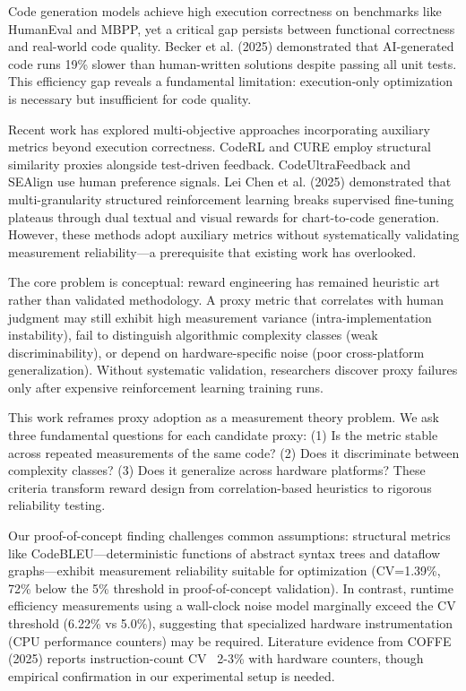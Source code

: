 
Code generation models achieve high execution correctness on benchmarks like HumanEval and MBPP, yet a critical gap persists between functional correctness and real-world code quality. Becker et al. (2025) demonstrated that AI-generated code runs 19\% slower than human-written solutions despite passing all unit tests. This efficiency gap reveals a fundamental limitation: execution-only optimization is necessary but insufficient for code quality.

Recent work has explored multi-objective approaches incorporating auxiliary metrics beyond execution correctness. CodeRL and CURE employ structural similarity proxies alongside test-driven feedback. CodeUltraFeedback and SEAlign use human preference signals. Lei Chen et al. (2025) demonstrated that multi-granularity structured reinforcement learning breaks supervised fine-tuning plateaus through dual textual and visual rewards for chart-to-code generation. However, these methods adopt auxiliary metrics without systematically validating measurement reliability---a prerequisite that existing work has overlooked.

The core problem is conceptual: reward engineering has remained heuristic art rather than validated methodology. A proxy metric that correlates with human judgment may still exhibit high measurement variance (intra-implementation instability), fail to distinguish algorithmic complexity classes (weak discriminability), or depend on hardware-specific noise (poor cross-platform generalization). Without systematic validation, researchers discover proxy failures only after expensive reinforcement learning training runs.

This work reframes proxy adoption as a measurement theory problem. We ask three fundamental questions for each candidate proxy: (1) Is the metric stable across repeated measurements of the same code? (2) Does it discriminate between complexity classes? (3) Does it generalize across hardware platforms? These criteria transform reward design from correlation-based heuristics to rigorous reliability testing.

Our proof-of-concept finding challenges common assumptions: structural metrics like CodeBLEU---deterministic functions of abstract syntax trees and dataflow graphs---exhibit measurement reliability suitable for optimization (CV=1.39\%, 72\% below the 5\% threshold in proof-of-concept validation). In contrast, runtime efficiency measurements using a wall-clock noise model marginally exceed the CV threshold (6.22\% vs 5.0\%), suggesting that specialized hardware instrumentation (CPU performance counters) may be required. Literature evidence from COFFE (2025) reports instruction-count CV ~2-3\% with hardware counters, though empirical confirmation in our experimental setup is needed.

